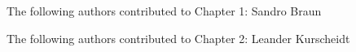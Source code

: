\noindent The following authors contributed to Chapter 1: Sandro Braun

\noindent The following authors contributed to Chapter 2: Leander Kurscheidt